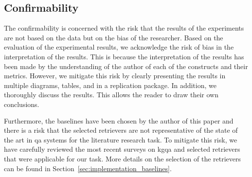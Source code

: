 \subsection{Confirmability}

The confirmability is concerned with the risk that the results of the experiments are not based on the data but on the bias of the researcher. Based on the evaluation of the experimental results, we acknowledge the risk of bias in the interpretation of the results. This is because the interpretation of the results has been made by the understanding of the author of each of the constructs and their metrics. However, we mitigate this risk by clearly presenting the results in multiple diagrams, tables, and in a replication package. In addition, we thoroughly discuss the results. This allows the reader to draw their own conclusions. 

Furthermore, the baselines have been chosen by the author of this paper and there is a risk that the selected retrievers are not representative of the state of the art in \gls{qa} systems for the literature research task. To mitigate this risk, we have carefully reviewed the most recent surveys \cite{yani_challenges_2021,procko_graph_2024,agrawal_can_2024,peng_graph_2024,li_survey_2024,pan_unifying_2024} on \gls{kgqa} and selected retrievers that were applicable for our task. More details on the selection of the retrievers can be found in Section~\ref{sec:implementation_baselines}.

